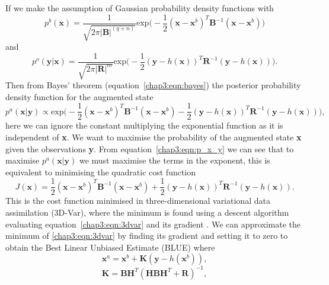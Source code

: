 If we make the assumption of Gaussian probability density functions with
\begin{equation}
p^{b}(\textbf{x}) = \frac{1}{\sqrt{2\pi |\textbf{B}|^{(q+n)}}}\text{exp}\big(-\frac{1}{2}(\textbf{x}-\textbf{x}^{b})^{T}\textbf{B}^{-1}(\textbf{x}-\textbf{x}^{b})\big)
\end{equation}
and
\begin{equation}
p^{o}(\textbf{y}|\textbf{x}) = \frac{1}{\sqrt{2\pi |\textbf{R}|^{m}}}\text{exp}\big(-\frac{1}{2}(\textbf{y}-h(\textbf{x}))^{T}\textbf{R}^{-1}(\textbf{y}-h(\textbf{x}))\big).
\end{equation}
Then from Bayes' theorem (equation~\eqref{chap3:eqn:bayes}) the posterior probability density function for the augmented state
\begin{equation}
p^{a}(\textbf{x}|\textbf{y}) \propto \text{exp}\big(-\frac{1}{2}(\textbf{x}-\textbf{x}^{b})^{T}\textbf{B}^{-1}(\textbf{x}-\textbf{x}^{b})-\frac{1}{2}(\textbf{y}-h(\textbf{x}))^{T}\textbf{R}^{-1}(\textbf{y}-h(\textbf{x}))\big), \label{chap3:eqn:p_x_y}
\end{equation} 
here we can ignore the constant multiplying the exponential function as it is independent of \textbf{x}. We want to maximise the probability of the augmented state \textbf{x} given the observations \textbf{y}. From equation~\eqref{chap3:eqn:p_x_y} we can see that to maximise \(p^{a}(\textbf{x}|\textbf{y})\) we must maximise the terms in the exponent, this is equivalent to minimising the quadratic cost function 
\begin{equation}
J(\textbf{x}) = \frac{1}{2}(\textbf{x}-\textbf{x}^{b})^{T}\textbf{B}^{-1}(\textbf{x}-\textbf{x}^{b}) + \frac{1}{2}(\textbf{y}-h(\textbf{x}))^{T}\textbf{R}^{-1}(\textbf{y}-h(\textbf{x})). \label{chap3:eqn:3dvar}
\end{equation}
This is the cost function minimised in three-dimensional variational data assimilation (3D-Var), where the minimum is found using a descent algorithm evaluating equation~\eqref{chap3:eqn:3dvar} and its gradient \citep{courtier1998ecmwf}. We can approximate the minimum of \eqref{chap3:eqn:3dvar} by finding its gradient and setting it to zero to obtain the Best Linear Unbiased Estimate (BLUE) \citep{talagrand1997assimilation} where
\begin{equation}
\textbf{x}^{a} = \textbf{x}^{b} + \textbf{K}(\textbf{y} - h(\textbf{x}^{b})), \label{chap3:eqn:blue}
\end{equation}
\begin{equation}
\textbf{K} = \textbf{B}\textbf{H}^{T}(\textbf{H}\textbf{B}\textbf{H}^{T}+\textbf{R})^{-1},
\end{equation}
